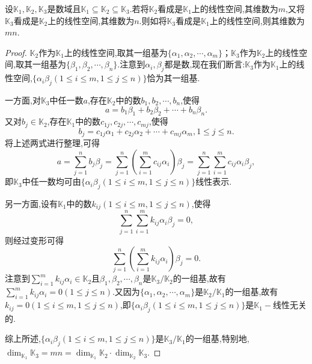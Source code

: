 \documentclass[../../main.tex]{subfiles}%
\begin{document}
\begin{proposition}\label{proposition:数域上的线性空间的维数的传递性}
设\(\mathbb{K}_1,\mathbb{K}_2,\mathbb{K}_3\)是数域且\(\mathbb{K}_1\subseteq\mathbb{K}_2\subseteq\mathbb{K}_3\).若将\(\mathbb{K}_2\)看成是\(\mathbb{K}_1\)上的线性空间,其维数为\(m\),又将\(\mathbb{K}_3\)看成是\(\mathbb{K}_2\)上的线性空间,其维数为\(n\).则如将\(\mathbb{K}_3\)看成是\(\mathbb{K}_1\)上的线性空间,则其维数为\(mn\).
\end{proposition}
\begin{proof}
\(\mathbb{K}_2\)作为\(\mathbb{K}_1\)上的线性空间,取其一组基为\(\{\alpha_1,\alpha_2,\cdots,\alpha_m\}\)；\(\mathbb{K}_3\)作为\(\mathbb{K}_2\)上的线性空间,取其一组基为\(\{\beta_1,\beta_2,\cdots,\beta_n\}\).注意到\(\alpha_i,\beta_j\)都是数,现在我们断言:\(\mathbb{K}_3\)作为\(\mathbb{K}_1\)上的线性空间,\(\{\alpha_i\beta_j(1\leqslant  i\leqslant  m,1\leqslant  j\leqslant  n)\}\)恰为其一组基.

一方面,对\(\mathbb{K}_3\)中任一数\(a\),存在\(\mathbb{K}_2\)中的数\(b_1,b_2,\cdots,b_n\),使得
\[
a = b_1\beta_1 + b_2\beta_2+\cdots + b_n\beta_n.
\]
又对\(b_j\in\mathbb{K}_2\),存在\(\mathbb{K}_1\)中的数\(c_{1j},c_{2j},\cdots,c_{mj}\),使得
\[
b_j = c_{1j}\alpha_1 + c_{2j}\alpha_2+\cdots + c_{mj}\alpha_m,1\leqslant  j\leqslant  n.
\]
将上述两式进行整理,可得
\[
a=\sum_{j = 1}^{n}b_j\beta_j=\sum_{j = 1}^{n}\left(\sum_{i = 1}^{m}c_{ij}\alpha_i\right)\beta_j=\sum_{j = 1}^{n}\sum_{i = 1}^{m}c_{ij}\alpha_i\beta_j,
\]
即\(\mathbb{K}_3\)中任一数均可由\(\{\alpha_i\beta_j(1\leqslant  i\leqslant  m,1\leqslant  j\leqslant  n)\}\)线性表示.

另一方面,设有\(\mathbb{K}_1\)中的数\(k_{ij}(1\leqslant  i\leqslant  m,1\leqslant  j\leqslant  n)\),使得
\[
\sum_{j = 1}^{n}\sum_{i = 1}^{m}k_{ij}\alpha_i\beta_j = 0,
\]
则经过变形可得
\[
\sum_{j = 1}^{n}\left(\sum_{i = 1}^{m}k_{ij}\alpha_i\right)\beta_j = 0.
\]
注意到\(\sum_{i = 1}^{m}k_{ij}\alpha_i\in\mathbb{K}_2\)且\(\beta_1,\beta_2,\cdots,\beta_n\)是\(\mathbb{K}_3/\mathbb{K}_2\)的一组基,故有\(\sum_{i = 1}^{m}k_{ij}\alpha_i = 0(1\leqslant  j\leqslant  n)\).又因为\(\{\alpha_1,\alpha_2,\cdots,\alpha_m\}\)是\(\mathbb{K}_2/\mathbb{K}_1\)的一组基,故有\(k_{ij}=0(1\leqslant  i\leqslant  m,1\leqslant  j\leqslant  n)\),即\(\{\alpha_i\beta_j(1\leqslant  i\leqslant  m,1\leqslant  j\leqslant  n)\}\)是\(\mathbb{K}_1-\)线性无关的.

综上所述,\(\{\alpha_i\beta_j(1\leqslant  i\leqslant  m,1\leqslant  j\leqslant  n)\}\)是\(\mathbb{K}_3/\mathbb{K}_1\)的一组基,特别地,\(\dim_{\mathbb{K}_1}\mathbb{K}_3=mn=\dim_{\mathbb{K}_1}\mathbb{K}_2\cdot\dim_{\mathbb{K}_2}\mathbb{K}_3\).
\end{proof}
\end{document}
